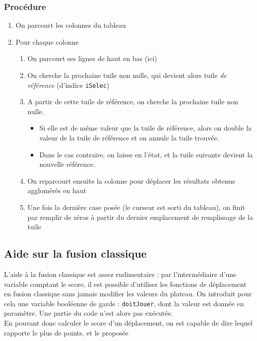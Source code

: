 \documentclass[12pt,a4paper]{article}
\begin{document}
\subsubsection*{Procédure}
\begin{enumerate}[label=\Alph* :]
\item On parcourt les colonnes du tableau
\item Pour chaque colonne
\begin{enumerate}[label=\arabic* :]
\item On parcourt ses lignes de haut en bas (ici)
\item On cherche la prochaine tuile non nulle, qui devient alors tuile \emph{de référence} (d'indice \texttt{iSelec})
\item A partir de cette tuile de référence, on cherche la prochaine tuile non nulle.
\begin{itemize}
\item Si elle est de même valeur que la tuile de référence, alors on double la valeur de la tuile de référence et on annule la tuile trouvée.
\item Dans le cas contraire, on laisse en l'état, et la tuile suivante devient la nouvelle référence.
\end{itemize}
\item On reparcourt ensuite la colonne pour déplacer les résultats obtenus agglomérés en haut
\item Une fois la dernière case posée (le curseur est sorti du tableau), on finit par remplir de zéros à partir du dernier emplacement de remplissage de la tuile 
\end{enumerate}
\end{enumerate}


\subsection{Aide sur la fusion classique}
L'aide à la fusion classique est assez rudimentaire : par l'intermédiaire d'une variable comptant le score, il est possible d'utiliser les fonctions de déplacement en fusion classique sans jamais modifier les valeurs du plateau. On introduit pour cela une variable booléenne de garde : \texttt{doitJouer}, dont la valeur est donnée en paramètre. Une partie du code n'est alors pas exécutée. \\
En pouvant donc calculer le score d'un déplacement, on est capable de dire lequel rapporte le plus de points, et le proposée
\end{document}
